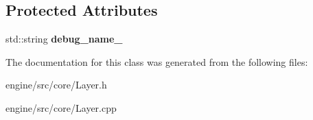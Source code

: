 \subsection*{Protected Attributes}
\begin{DoxyCompactItemize}
\item 
\mbox{\label{classengine_1_1Layer_a9283719bf3b3d956809ef351a43ee16f}} 
std\+::string {\bfseries debug\+\_\+name\+\_\+}
\end{DoxyCompactItemize}


The documentation for this class was generated from the following files\+:\begin{DoxyCompactItemize}
\item 
engine/src/core/Layer.\+h\item 
engine/src/core/Layer.\+cpp\end{DoxyCompactItemize}

